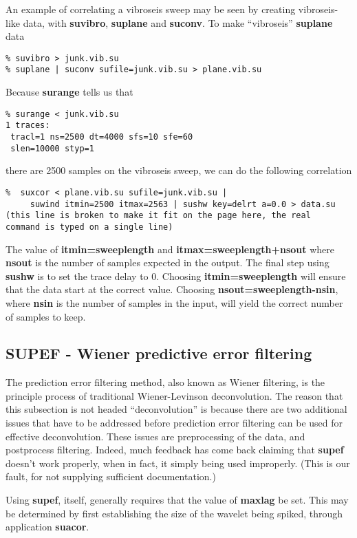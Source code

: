 {{{{{{{An example of correlating a vibroseis sweep may be seen by creating
vibroseis-like data, with {\bf suvibro\/}, {\bf suplane\/} and {\bf suconv\/}.
To make ``vibroseis'' {\bf suplane\/} data

{\small \begin{verbatim}
% suvibro > junk.vib.su
% suplane | suconv sufile=junk.vib.su > plane.vib.su
\end{verbatim}}\noindent

Because {\bf surange\/} tells us that
{\small \begin{verbatim}
% surange < junk.vib.su
1 traces:
 tracl=1 ns=2500 dt=4000 sfs=10 sfe=60
 slen=10000 styp=1
\end{verbatim}}\noindent

there are 2500 samples on the vibroseis sweep, we can do the following
correlation
{\small \begin{verbatim}
%  suxcor < plane.vib.su sufile=junk.vib.su |
     suwind itmin=2500 itmax=2563 | sushw key=delrt a=0.0 > data.su
(this line is broken to make it fit on the page here, the real
command is typed on a single line)
\end{verbatim}}\noindent
The value of {\bf itmin=sweeplength\/} and {\bf itmax=sweeplength+nsout\/}
where {\bf nsout\/} is the number of samples expected in the output.
The final step using {\bf sushw\/} is to set the trace delay to 0.
Choosing {\bf itmin=sweeplength\/} will ensure that the data start
at the correct value. Choosing {\bf nsout=sweeplength-nsin\/}, where
{\bf nsin\/} is the number of samples in the input, will yield the
correct number of samples to keep.

\subsection{SUPEF - Wiener predictive error filtering}
The prediction error filtering method, also known as Wiener filtering,
is the principle process of traditional Wiener-Levinson deconvolution.
The reason that this subsection is not headed ``deconvolution'' is
because there are two additional issues that have to be addressed
before prediction error filtering can be used for effective deconvolution.
These issues are preprocessing of the data, and postprocess filtering.
Indeed, much feedback has come back claiming that {\bf supef\/}
doesn't work properly, when in fact, it simply being used improperly.
(This is our fault, for not supplying sufficient documentation.)

Using {\bf supef\/}, itself, generally requires that the value
of {\bf maxlag\/} be set. This may be determined by first establishing the
size of the wavelet being spiked, through application {\bf suacor\/}.

}}}}}}}

